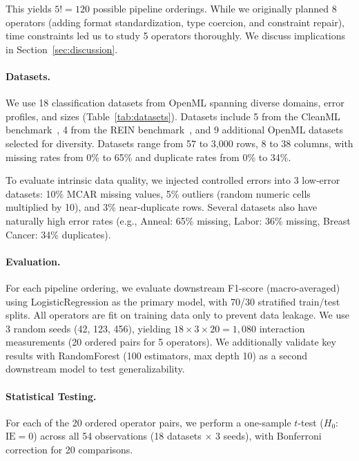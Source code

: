 \documentclass[preprint]{article}
\newcommand{\ie}{\text{IE}}
\begin{document}
This yields $5! = 120$ possible pipeline orderings. While we originally planned 8 operators (adding format standardization, type coercion, and constraint repair), time constraints led us to study 5 operators thoroughly. We discuss implications in Section~\ref{sec:discussion}.

\paragraph{Datasets.} We use 18 classification datasets from OpenML spanning diverse domains, error profiles, and sizes (Table~\ref{tab:datasets}). Datasets include 5 from the CleanML benchmark~\citep{Li2021CleanML}, 4 from the REIN benchmark~\citep{Abdelaal2023REIN}, and 9 additional OpenML datasets selected for diversity. Datasets range from 57 to 3,000 rows, 8 to 38 columns, with missing rates from 0\% to 65\% and duplicate rates from 0\% to 34\%.

To evaluate intrinsic data quality, we injected controlled errors into 3 low-error datasets: 10\% MCAR missing values, 5\% outliers (random numeric cells multiplied by 10), and 3\% near-duplicate rows. Several datasets also have naturally high error rates (e.g., Anneal: 65\% missing, Labor: 36\% missing, Breast Cancer: 34\% duplicates).

\paragraph{Evaluation.} For each pipeline ordering, we evaluate downstream F1-score (macro-averaged) using LogisticRegression as the primary model, with 70/30 stratified train/test splits. All operators are fit on training data only to prevent data leakage. We use 3 random seeds (42, 123, 456), yielding $18 \times 3 \times 20 = 1{,}080$ interaction measurements (20 ordered pairs for 5 operators). We additionally validate key results with RandomForest (100 estimators, max depth 10) as a second downstream model to test generalizability.

\paragraph{Statistical Testing.} For each of the 20 ordered operator pairs, we perform a one-sample $t$-test ($H_0$: $\ie = 0$) across all 54 observations (18 datasets $\times$ 3 seeds), with Bonferroni correction for 20 comparisons.
\end{document}
